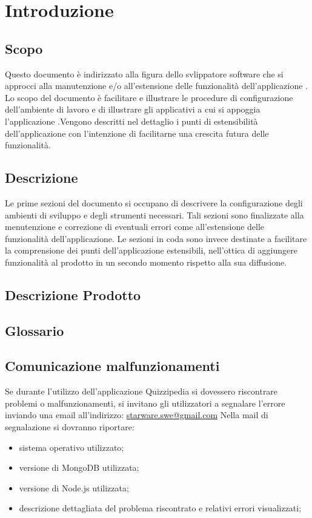 \documentclass[12pt,a4paper]{article}
\begin{document}
	\newpage
	\tableofcontents
	\newpage
	\listoftables
	\listoffigures
	\newpage
	
	
	\section{Introduzione}	\label{intro}
	
	\subsection{Scopo}
	Questo documento è indirizzato alla figura dello svlippatore software che si approcci alla manutenzione e/o all'estensione delle funzionalità dell'applicazione \prj{}.
	Lo scopo del documento è facilitare e illustrare le procedure di configurazione dell'ambiente di lavoro e di illustrare gli applicativi a cui si appoggia l'applicazione \prj{}.Vengono descritti nel dettaglio i punti di estensibilità dell'applicazione con l'intenzione di facilitarne una crescita futura delle funzionalità.
	
	\subsection{Descrizione}
	Le prime sezioni del documento si occupano di descrivere la configurazione degli ambienti di sviluppo e degli strumenti necessari. Tali sezioni sono finalizzate alla menutenzione e correzione di eventuali errori come all'estensione delle funzionalità dell'applicazione. Le sezioni in coda sono invece destinate a facilitare la comprensione dei punti dell'applicazione estensibili, nell'ottica di aggiungere funzionalità al prodotto in un secondo momento rispetto alla sua diffusione.
	
	\subsection{Descrizione Prodotto}
	\descrizioneProdotto
	
	\subsection{Glossario}
	\glossarioPrint
	\subsection{Comunicazione malfunzionamenti}
		Se durante l’utilizzo dell’applicazione Quizzipedia si dovessero riscontrare problemi o
		malfunzionamenti, si invitano gli utilizzatori a segnalare l’errore inviando una email
		all’indirizzo:
		\url{starware.swe@gmail.com}
		Nella mail di segnalazione si dovranno riportare:
		\begin{itemize}
			\item sistema operativo utilizzato;
			\item versione di MongoDB utilizzata;
			\item versione di Node.js utilizzata;
			\item descrizione dettagliata del problema riscontrato e relativi errori visualizzati;
		\end{itemize}
\end{document}
